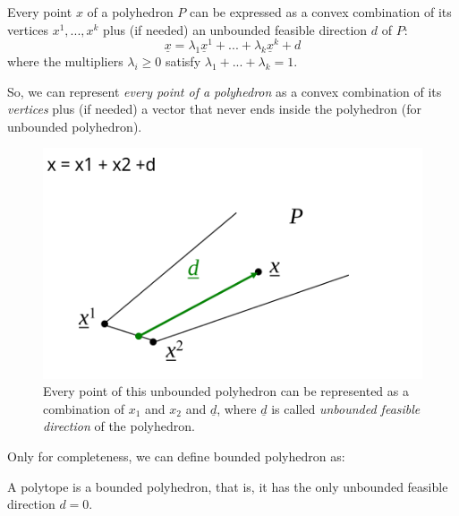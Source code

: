            
            \begin{theorem}
                Every point $x$ of a polyhedron $P$ can be expressed as a convex combination of its vertices $x^1 , . . . , x^k$ plus (if needed) an unbounded feasible direction $d$ of $P$:
                $$ \underline{x} = \lambda_1 \underline{x}^1 + ... + \lambda_k \underline{x}^k + d$$
                where the multipliers $\lambda_i \geq 0$ satisfy $\lambda_1 + ... + \lambda_k = 1$.
            \end{theorem}
            So, we can represent \textit{every point of a polyhedron} as a convex combination of its \textit{vertices} plus (if needed) a vector that never ends inside the polyhedron (for unbounded polyhedron).

            \begin{figure}[H]
                \centering
                \includegraphics{./images/Polyhedron2.png}
                \caption{Every point of this unbounded polyhedron can be represented as a combination of $x_1$ and $x_2$ and $\underline{d}$, where $\underline{d}$ is called \textit{unbounded feasible direction} of the polyhedron.} 
            \end{figure}
            Only for completeness, we can define bounded polyhedron as:
            \begin{definition}[Polytope]
                A polytope is a bounded polyhedron, that is, it has the only unbounded feasible direction $d = 0$.
            \end{definition}
